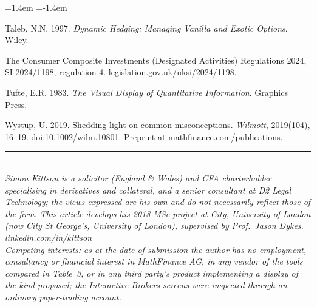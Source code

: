\documentclass[11pt,a4paper]{article}
\begin{document}
\begin{list}{}{\leftmargin=1.4em \itemindent=-1.4em \itemsep=4pt \topsep=6pt}
\item Taleb, N.N. 1997. \emph{Dynamic Hedging: Managing Vanilla and Exotic Options}. Wiley.
\item The Consumer Composite Investments (Designated Activities) Regulations 2024, SI 2024/1198, regulation 4. legislation.gov.uk/uksi/2024/1198.
\item Tufte, E.R. 1983. \emph{The Visual Display of Quantitative Information}. Graphics Press.
\item Wystup, U. 2019. Shedding light on common misconceptions. \emph{Wilmott}, 2019(104), 16--19. doi:10.1002/wilm.10801. Preprint at mathfinance.com/publications.
\end{list}

\vspace{8pt}
\noindent\rule{\linewidth}{0.4pt}\\[4pt]
{\small\itshape Simon Kittson is a solicitor (England \& Wales) and CFA charterholder specialising in derivatives and collateral, and a senior consultant at D2 Legal Technology; the views expressed are his own and do not necessarily reflect those of the firm. This article develops his 2018 MSc project at City, University of London (now City St George's, University of London), supervised by Prof.\ Jason Dykes. linkedin.com/in/kittson}\\[4pt]
{\small\itshape Competing interests: as at the date of submission the author has no employment, consultancy or financial interest in MathFinance AG, in any vendor of the tools compared in Table~3, or in any third party's product implementing a display of the kind proposed; the Interactive Brokers screens were inspected through an ordinary paper-trading account.}
\end{document}

